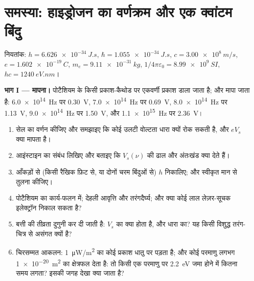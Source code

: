 \section{समस्या: हाइड्रोजन का वर्णक्रम और एक क्वांटम बिंदु}

\begin{problem}
\label{pb:b1:quantum-introduction:1}
नियतांक: $h = \qty{6.626e-34}{J.s}$, $\hbar = \qty{1.055e-34}{J.s}$, $c =
\qty{3.00e8}{m/s}$, $e = \qty{1.602e-19}{C}$, $m_e = \qty{9.11e-31}{kg}$,
$1/4\pi\varepsilon_0 = \qty{8.99e9}{SI}$, $hc = \qty{1240}{eV.nm}$।

\medskip
\noindent\textbf{भाग I ---  मापना।}
पोटैशियम के किसी प्रकाश-कैथोड पर एकवर्णी प्रकाश डाला जाता है; और  मापा जाता है: \qty{6.0e14}{Hz} पर \qty{0.30}{V}, \qty{7.0e14}{Hz} पर
\qty{0.69}{V}, \qty{8.0e14}{Hz} पर \qty{1.13}{V}, \qty{9.0e14}{Hz} पर
\qty{1.50}{V}, और \qty{1.1e15}{Hz} पर \qty{2.36}{V}।
\begin{enumerate}
  \item सेल का वर्णन कीजिए और समझाइए कि कोई उलटी वोल्टता धारा क्यों रोक
        सकती है, और $eV_s$ क्या मापता है।
  \item आइंस्टाइन का संबंध लिखिए और बताइए कि $V_s(\nu)$ की ढाल और
        अंतःखंड क्या देते हैं।
  \item आँकड़ों से (किसी रैखिक फ़िट से, या दोनों चरम बिंदुओं से)
        $h$ निकालिए; और स्वीकृत मान से तुलना कीजिए।
  \item पोटैशियम का कार्य-फलन  में; देहली आवृत्ति और
        तरंगदैर्घ्य; और क्या कोई लाल लेज़र-सूचक इलेक्ट्रॉन निकाल सकता है?
  \item बत्ती की तीव्रता दुगुनी कर दी जाती है: $V_s$ का क्या होता है, और
        धारा का? यह किसी विशुद्ध तरंग-चित्र से असंगत क्यों है?
  \item चिरसम्मत आकलन: \qty{1}{\micro W/m^2} का कोई प्रकाश धातु पर पड़ता
        है; और कोई परमाणु लगभग \qty{1e-20}{m^2} का क्षेत्रफल देता है: तो
        किसी एक परमाणु पर \qty{2.2}{eV} जमा होने में कितना समय लगता? इसकी
        जगह देखा क्या जाता है?
\end{enumerate}


\end{problem}
